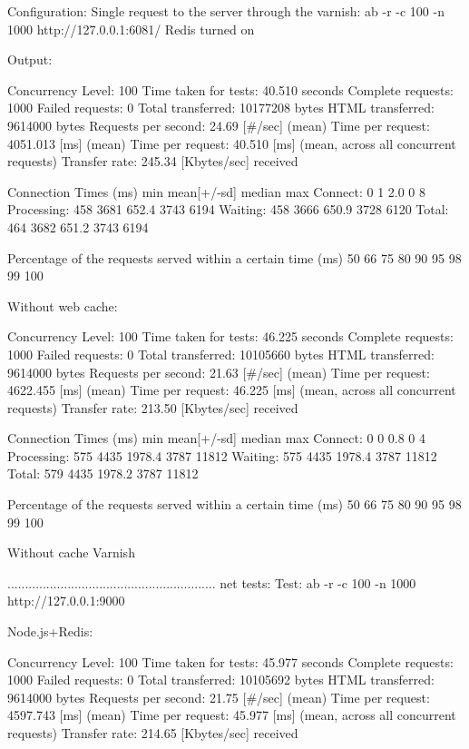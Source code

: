 Configuration:
Single request to the server through the varnish:
    ab -r -c 100 -n 1000    http://127.0.0.1:6081/
Redis turned on

Output: 

Concurrency Level:      100
Time taken for tests:   40.510 seconds
Complete requests:      1000
Failed requests:        0
Total transferred:      10177208 bytes
HTML transferred:       9614000 bytes
Requests per second:    24.69 [#/sec] (mean)
Time per request:       4051.013 [ms] (mean)
Time per request:       40.510 [ms] (mean, across all concurrent requests)
Transfer rate:          245.34 [Kbytes/sec] received

Connection Times (ms)
              min  mean[+/-sd] median   max
Connect:        0    1   2.0      0       8
Processing:   458 3681 652.4   3743    6194
Waiting:      458 3666 650.9   3728    6120
Total:        464 3682 651.2   3743    6194

Percentage of the requests served within a certain time (ms)
  50%
  66%
  75%
  80%
  90%
  95%
  98%
  99%
 100%


Without web cache:

Concurrency Level:      100
Time taken for tests:   46.225 seconds
Complete requests:      1000
Failed requests:        0
Total transferred:      10105660 bytes
HTML transferred:       9614000 bytes
Requests per second:    21.63 [#/sec] (mean)
Time per request:       4622.455 [ms] (mean)
Time per request:       46.225 [ms] (mean, across all concurrent requests)
Transfer rate:          213.50 [Kbytes/sec] received

Connection Times (ms)
              min  mean[+/-sd] median   max
Connect:        0    0   0.8      0       4
Processing:   575 4435 1978.4   3787   11812
Waiting:      575 4435 1978.4   3787   11812
Total:        579 4435 1978.2   3787   11812

Percentage of the requests served within a certain time (ms)
  50%
  66%
  75%
  80%
  90%
  95%
  98%
  99%
 100%



Without cache
Varnish 

...........................................................
net tests:
Test: ab -r -c 100 -n 1000    http://127.0.0.1:9000

Node.js+Redis: 

Concurrency Level:      100
Time taken for tests:   45.977 seconds
Complete requests:      1000
Failed requests:        0
Total transferred:      10105692 bytes
HTML transferred:       9614000 bytes
Requests per second:    21.75 [#/sec] (mean)
Time per request:       4597.743 [ms] (mean)
Time per request:       45.977 [ms] (mean, across all concurrent requests)
Transfer rate:          214.65 [Kbytes/sec] received

